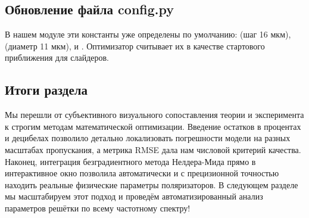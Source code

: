 \subsection{Обновление файла config.py}

В нашем модуле  эти константы уже определены по умолчанию:  (шаг 16 мкм),  (диаметр 11 мкм),  и . Оптимизатор считывает их в качестве стартового приближения для слайдеров.

\subsection{Итоги раздела}
Мы перешли от субъективного визуального сопоставления теории и эксперимента к строгим методам математической оптимизации. Введение остатков в процентах и децибелах позволило детально локализовать погрешности модели на разных масштабах пропускания, а метрика RMSE дала нам числовой критерий качества. Наконец, интеграция безградиентного метода Нелдера-Мида прямо в интерактивное окно позволила автоматически и с прецизионной точностью находить реальные физические параметры поляризаторов. В следующем разделе мы масштабируем этот подход и проведём автоматизированный анализ параметров решётки по всему частотному спектру!
